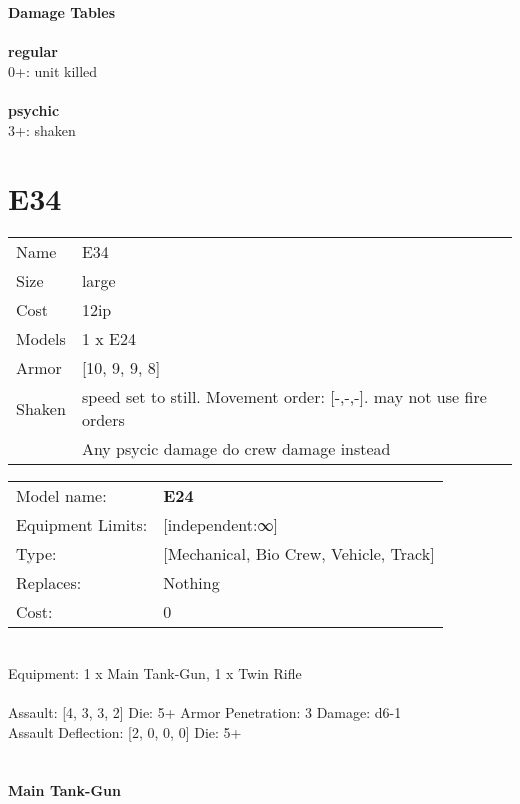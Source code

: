 {\bf Damage Tables} \\
\ \\ {\bf regular } \\
0+: unit killed \\
\ \\ {\bf psychic } \\
3+: shaken \\










\pagebreak\pagebreak

\section{ E34 }

\begin{tabular}{ll}
  Name & E34 \\
  Size & large\\
  Cost & 12ip\\
  Models & 1 x E24\\
  Armor & [10, 9, 9, 8]\\
  Shaken & speed set to still. Movement order: [-,-,-]. may not use fire orders \\ & Any psycic damage do crew damage instead\\
\end{tabular}

\noindent 

\noindent
\begin{tabular}{ll}
Model name: &{\bf E24 } \\
Equipment Limits: &[independent:∞] \\
Type: &[Mechanical, Bio Crew, Vehicle, Track] \\
Replaces: &Nothing \\
Cost: & 0\\
\end{tabular}
\ \\
Equipment: 1 x Main Tank-Gun, 1 x Twin Rifle \\
\ \\
Assault: [4, 3, 3, 2] Die: 5+ Armor Penetration: 3 Damage: d6-1 \\
Assault Deflection: [2, 0, 0, 0] Die: 5+\\
\indent  
\ \\

\ \\
{\bf Main Tank-Gun } \\



